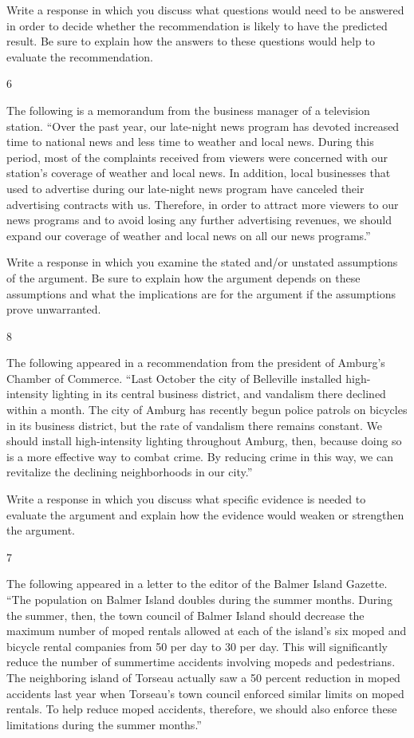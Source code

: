 \documentclass[]{article}
\begin{document}
Write a response in which you discuss what questions would need to be
answered in order to decide whether the recommendation is likely to have
the predicted result. Be sure to explain how the answers to these
questions would help to evaluate the recommendation.

6

The following is a memorandum from the business manager of a television
station. ``Over the past year, our late-night news program has devoted
increased time to national news and less time to weather and local news.
During this period, most of the complaints received from viewers were
concerned with our station's coverage of weather and local news. In
addition, local businesses that used to advertise during our late-night
news program have canceled their advertising contracts with us.
Therefore, in order to attract more viewers to our news programs and to
avoid losing any further advertising revenues, we should expand our
coverage of weather and local news on all our news programs.''

Write a response in which you examine the stated and/or unstated
assumptions of the argument. Be sure to explain how the argument depends
on these assumptions and what the implications are for the argument if
the assumptions prove unwarranted.

8

The following appeared in a recommendation from the president of
Amburg's Chamber of Commerce. ``Last October the city of Belleville
installed high-intensity lighting in its central business district, and
vandalism there declined within a month. The city of Amburg has recently
begun police patrols on bicycles in its business district, but the rate
of vandalism there remains constant. We should install high-intensity
lighting throughout Amburg, then, because doing so is a more effective
way to combat crime. By reducing crime in this way, we can revitalize
the declining neighborhoods in our city.''

Write a response in which you discuss what specific evidence is needed
to evaluate the argument and explain how the evidence would weaken or
strengthen the argument.

7

The following appeared in a letter to the editor of the Balmer Island
Gazette. ``The population on Balmer Island doubles during the summer
months. During the summer, then, the town council of Balmer Island
should decrease the maximum number of moped rentals allowed at each of
the island's six moped and bicycle rental companies from 50 per day to
30 per day. This will significantly reduce the number of summertime
accidents involving mopeds and pedestrians. The neighboring island of
Torseau actually saw a 50 percent reduction in moped accidents last year
when Torseau's town council enforced similar limits on moped rentals. To
help reduce moped accidents, therefore, we should also enforce these
limitations during the summer months.''
\end{document}
